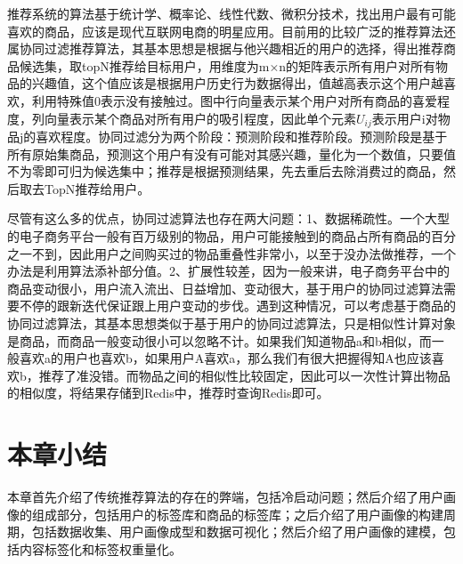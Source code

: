 		推荐系统的算法基于统计学、概率论、线性代数、微积分技术，找出用户最有可能喜欢的商品，应该是现代互联网电商的明星应用。目前用的比较广泛的推荐算法还属协同过滤推荐算法，其基本思想是根据与他兴趣相近的用户的选择，得出推荐商品候选集，取topN推荐给目标用户，用维度为m×n的矩阵表示所有用户对所有物品的兴趣值，这个值应该是根据用户历史行为数据得出，值越高表示这个用户越喜欢，利用特殊值0表示没有接触过。图中行向量表示某个用户对所有商品的喜爱程度，列向量表示某个商品对所有用户的吸引程度，因此单个元素$U_{ij}$表示用户i对物品j的喜欢程度。协同过滤分为两个阶段：预测阶段和推荐阶段。预测阶段是基于所有原始集商品，预测这个用户有没有可能对其感兴趣，量化为一个数值，只要值不为零即可归为候选集中；推荐是根据预测结果，先去重后去除消费过的商品，然后取去TopN推荐给用户。

		尽管有这么多的优点，协同过滤算法也存在两大问题：1、数据稀疏性。一个大型的电子商务平台一般有百万级别的物品，用户可能接触到的商品占所有商品的百分之一不到，因此用户之间购买过的物品重叠性非常小，以至于没办法做推荐，一个办法是利用算法添补部分值\citep{recmd-slopone}。2、扩展性较差，因为一般来讲，电子商务平台中的商品变动很小，用户流入流出、日益增加、变动很大，基于用户的协同过滤算法需要不停的跟新迭代保证跟上用户变动的步伐。遇到这种情况，可以考虑基于商品的协同过滤算法，其基本思想类似于基于用户的协同过滤算法，只是相似性计算对象是商品，而商品一般变动很小可以忽略不计。如果我们知道物品a和b相似，而一般喜欢a的用户也喜欢b，如果用户A喜欢a，那么我们有很大把握得知A也应该喜欢b，推荐了准没错。而物品之间的相似性比较固定，因此可以一次性计算出物品的相似度，将结果存储到Redis中，推荐时查询Redis即可。

	\section{本章小结}
	本章首先介绍了传统推荐算法的存在的弊端，包括冷启动问题；然后介绍了用户画像的组成部分，包括用户的标签库和商品的标签库；之后介绍了用户画像的构建周期，包括数据收集、用户画像成型和数据可视化；然后介绍了用户画像的建模，包括内容标签化和标签权重量化。
